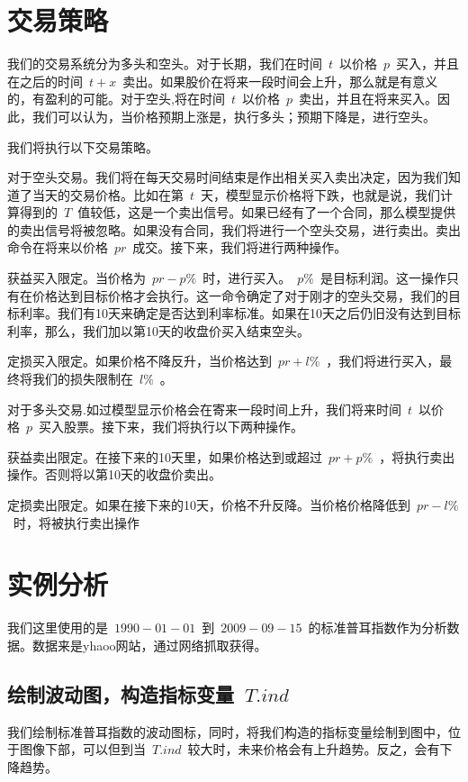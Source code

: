 \documentclass{article}\usepackage[]{graphicx}\usepackage[]{color}
\newenvironment{knitrout}{}{} %
\begin{document}
\begin{CJK*}{UTF8}{gkai}
\section{交易策略}
我们的交易系统分为多头和空头。对于长期，我们在时间~$t$~以价格~$p$~买入，并且在之后的时间~$t+x$~卖出。如果股价在将来一段时间会上升，那么就是有意义的，有盈利的可能。对于空头,将在时间~$t$~以价格~$p$~卖出，并且在将来买入。因此，我们可以认为，当价格预期上涨是，执行多头；预期下降是，进行空头。

我们将执行以下交易策略。

对于空头交易。我们将在每天交易时间结束是作出相关买入卖出决定，因为我们知道了当天的交易价格。比如在第~$t$~天，模型显示价格将下跌，也就是说，我们计算得到的~$T$~值较低，这是一个卖出信号。如果已经有了一个合同，那么模型提供的卖出信号将被忽略。如果没有合同，我们将进行一个空头交易，进行卖出。卖出命令在将来以价格~$pr$~成交。接下来，我们将进行两种操作。

\textbullet 获益买入限定。当价格为~$pr-p\%$~时，进行买入。~$p\%$~是目标利润。这一操作只有在价格达到目标价格才会执行。这一命令确定了对于刚才的空头交易，我们的目标利率。我们有10天来确定是否达到利率标准。如果在10天之后仍旧没有达到目标利率，那么，我们加以第10天的收盘价买入结束空头。

\textbullet 定损买入限定。如果价格不降反升，当价格达到~$pr+l\%$~，我们将进行买入，最终将我们的损失限制在~$l\%$~。

对于多头交易.如过模型显示价格会在寄来一段时间上升，我们将来时间~$t$~以价格~$p$~买入股票。接下来，我们将执行以下两种操作。

\textbullet 获益卖出限定。在接下来的10天里，如果价格达到或超过~$pr+p\%$~，将执行卖出操作。否则将以第10天的收盘价卖出。

\textbullet 定损卖出限定。如果在接下来的10天，价格不升反降。当价格价格降低到~$pr-l\%$~时，将被执行卖出操作
\section{实例分析}
我们这里使用的是~$1990-01-01$~到~$2009-09-15$~的标准普耳指数作为分析数据。数据来是yhaoo网站，通过网络抓取获得。
\subsection{绘制波动图，构造指标变量~$T.ind$~}
我们绘制标准普耳指数的波动图标，同时，将我们构造的指标变量绘制到图中，位于图像下部，可以但到当~$T.ind$~较大时，未来价格会有上升趋势。反之，会有下降趋势。


\begin{knitrout}
\color{fgcolor}


\end{knitrout}
\end{CJK*}
\end{document}

